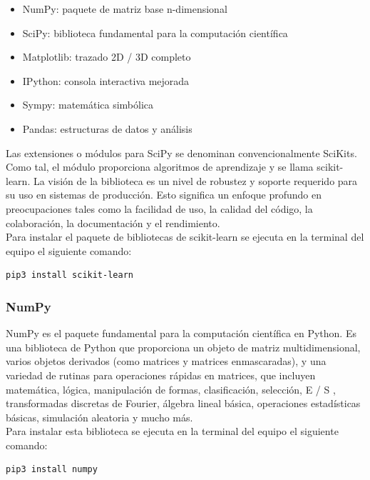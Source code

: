 {\begin{itemize}
    \item NumPy: paquete de matriz base n-dimensional
    \item SciPy: biblioteca fundamental para la computación científica
    \item Matplotlib: trazado 2D / 3D completo
    \item IPython: consola interactiva mejorada
    \item Sympy: matemática simbólica
    \item Pandas: estructuras de datos y análisis
\end{itemize}

\noindent Las extensiones o módulos para SciPy se denominan convencionalmente SciKits. Como tal, el módulo proporciona algoritmos de aprendizaje y se llama scikit-learn.
La visión de la biblioteca es un nivel de robustez y soporte requerido para su uso en sistemas de producción. Esto significa un enfoque profundo en preocupaciones tales como la facilidad de uso, la calidad del código, la colaboración, la documentación y el rendimiento.\\

\noindent Para instalar el paquete de bibliotecas de scikit-learn se ejecuta en la terminal del equipo el siguiente comando:

\begin{lstlisting}
pip3 install scikit-learn
\end{lstlisting}

\subsubsection{NumPy}{
\noindent NumPy es el paquete fundamental para la computación científica en Python. Es una biblioteca de Python que proporciona un objeto de matriz multidimensional, varios objetos derivados (como matrices y matrices enmascaradas), y una variedad de rutinas para operaciones rápidas en matrices, que incluyen matemática, lógica, manipulación de formas, clasificación, selección, E / S , transformadas discretas de Fourier, álgebra lineal básica, operaciones estadísticas básicas, simulación aleatoria y mucho más.\\

Para instalar esta biblioteca se ejecuta en la terminal del equipo el siguiente comando:

\begin{lstlisting}
pip3 install numpy
\end{lstlisting}
}
}